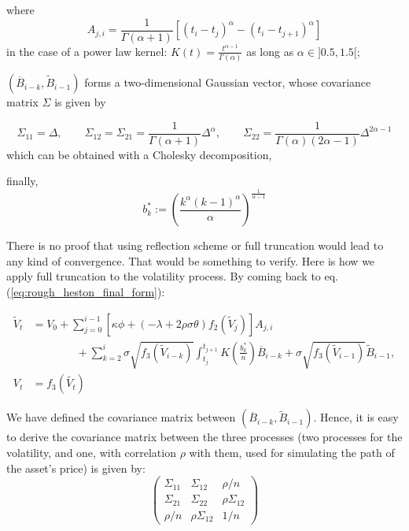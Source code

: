 where $$ A_{j,i} = \frac 1 {\Gamma ( \alpha +1 ) } [ ( t_i - t_j )^{\alpha} -  ( t_i - t_{j+1} )^{\alpha} ]$$
in the case of a power law kernel: $ K(t) = \frac{t^{\alpha - 1} }{\Gamma ( \alpha ) } $ as long as $\alpha \in ]0.5,1.5[$;

$( \overline{B}_{i-k},\tilde{B}_{i-1}) $ forms a two-dimensional Gaussian vector, whose covariance matrix $\Sigma$ is given by

$$ \Sigma_{11} = \Delta, \qquad \Sigma_{12} = \Sigma_{21} = \frac 1 {\Gamma ( \alpha + 1 ) } \Delta^{\alpha}, \qquad \Sigma_{22} = \frac{1}{ \Gamma (\alpha ) ( 2 \alpha - 1 ) }  \Delta^{2 \alpha - 1} $$
which can be obtained with a Cholesky decomposition,

finally, $$b_k^* := \left ( \frac{k^{ \alpha} (k-1)^{ \alpha} }{    \alpha }  \right )^{\frac{1}{\alpha - 1} } $$







There is no proof that using reflection scheme or full truncation would lead to any kind of convergence. That would be something to verify. Here is how we apply full truncation to the volatility process. By coming back to eq. (\ref{eq:rough_heston_final_form}):

\begin{align*}
\widetilde{V}_t &= V_0 
+ \sum_{j=0}^{i-1} [ \kappa \phi + (-\lambda + 2 \rho \sigma \theta ) f_2(\widetilde{V}_j) ] A_{j,i}  \\
& \qquad \qquad + \sum_{k=2}^{i} \sigma \sqrt{ f_3(\widetilde{V}_{i-k}) } \int_{t_j}^{t_{j+1} } K( \frac{b_k^*}{n} ) \overline{B}_{i-k} 
+ \sigma \sqrt{ f_3(\widetilde{V}_{i-1}) } \tilde{B }_{i-1},  \\
 V_t &= f_3( \widetilde{V_t} )
\end{align*} 

\begin{remarque}
We have defined the covariance matrix between $( \overline{B}_{i-k},\tilde{B}_{i-1}) $. Hence, it is easy to derive the covariance matrix between the three processes (two processes for the volatility, and one, with correlation $\rho$ with them, used for simulating the path of the asset's price) is given by: 
$$
\begin{pmatrix} 
\Sigma_{11} & \Sigma_{12}  & \rho / n
\\ 
\Sigma_{21} & \Sigma_{22} &  \rho \Sigma_{12}
\\
\rho / n & \rho \Sigma_{12} & 1/n \end{pmatrix}
$$
\end{remarque}

